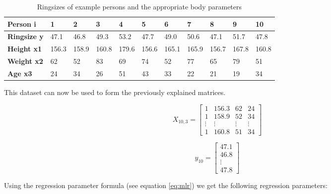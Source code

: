 \begin{table}[h]
    \centering
    \begin{tabular}{|l|l|l|l|l|l|l|l|l|l|l|}
    \hline
    \textbf{Person i}   & \textbf{1} & \textbf{2} & \textbf{3} & \textbf{4} & \textbf{5} & \textbf{6} & \textbf{7} & \textbf{8} & \textbf{9} & \textbf{10} \\ \hline
    \textbf{Ringsize y} & 47.1       & 46.8       & 49.3       & 53.2       & 47.7       & 49.0       & 50.6       & 47.1       & 51.7       & 47.8        \\ \hline
    \textbf{Height x1}  & 156.3      & 158.9      & 160.8      & 179.6      & 156.6      & 165.1      & 165.9      & 156.7      & 167.8      & 160.8       \\ \hline
    \textbf{Weight x2}  & 62         & 52         & 83         & 69         & 74         & 52         & 77         & 65         & 79         & 51          \\ \hline
    \textbf{Age x3}     & 24         & 34         & 26         & 51         & 43         & 33         & 22         & 21         & 19         & 34          \\ \hline
    \end{tabular}
    \caption{Ringsizes of example persons and the appropriate body parameters}
    \label{tab:mlr_ringsize}
\end{table}

This dataset can now be used to form the previously explained matrices.

\begin{equation}
    X_{10, 3} =
    \begin{bmatrix}
        1 & 156.3 & 62 & 24 \\
        1 & 158.9 & 52 & 34 \\
        \vdots & \vdots & \vdots & \vdots \\
        1 & 160.8 & 51 & 34
    \end{bmatrix}
\end{equation}

\begin{equation}
    y_{10} =
    \begin{bmatrix}
        47.1 \\
        46.8 \\
        \vdots \\
        47.8
    \end{bmatrix}
\end{equation}

Using the regression parameter formula (see equation \vref{eq:mlr}) we get the following regression parameters:


